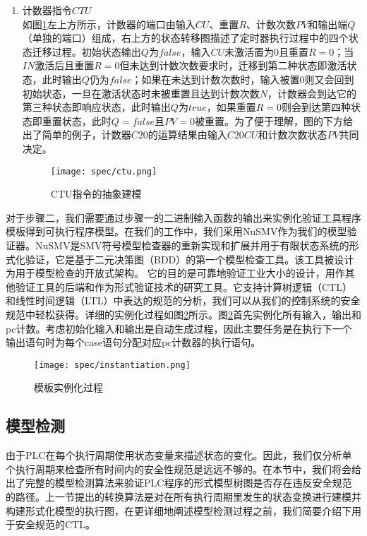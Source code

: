 \begin{enumerate}
	\item 计数器指令$CTU$\\
	如图\ref{fig23}左上方所示，计数器的端口由输入$CU$、重置$R$、计数次数$PV$和输出端$Q$（单独的端口）组成，右上方的状态转移图描述了定时器执行过程中的四个状态迁移过程。初始状态输出$Q$为$false$，输入$CU$未激活置为0且重置$R=0$；当$IN$激活后且重置$R=0$但未达到计数次数要求时，迁移到第二种状态即激活状态，此时输出$Q$仍为$false$；如果在未达到计数次数时，输入被置0则又会回到初始状态，一旦在激活状态时未被重置且达到计数次数$N$，计数器会到达它的第三种状态即响应状态，此时输出$Q$为$true$，如果重置$R=0$则会到达第四种状态即重置状态，此时$Q=false$且$PV=0$被重置。为了便于理解，图的下方给出了简单的例子，计数器$C20$的运算结果由输入$C20CU$和计数次数状态$PV$共同决定。

	\begin{figure}[!htb]
	\centering
	\texttt{[image: spec/ctu.png]}
	\caption{CTU指令的抽象建模}
	\label{fig23}
	\end{figure}
\end{enumerate}

对于步骤二，我们需要通过步骤一的二进制输入函数的输出来实例化验证工具程序模板得到可执行程序模型。在我们的工作中，我们采用NuSMV作为我们的模型验证器。NuSMV是SMV符号模型检查器的重新实现和扩展并用于有限状态系统的形式化验证，它是基于二元决策图（BDD）的第一个模型检查工具。该工具被设计为用于模型检查的开放式架构。 它的目的是可靠地验证工业大小的设计，用作其他验证工具的后端和作为形式验证技术的研究工具。它支持计算树逻辑（CTL）和线性时间逻辑（LTL）中表达的规范的分析，我们可以从我们的控制系统的安全规范中轻松获得。详细的实例化过程如图\ref{fig24}所示。图\ref{fig24}首先实例化所有输入，输出和pc计数。考虑初始化输入和输出是自动生成过程，因此主要任务是在执行下一个输出语句时为每个case语句分配对应pc计数器的执行语句。

\begin{figure}[!htb]
\centering
\texttt{[image: spec/instantiation.png]}
\caption{模板实例化过程}
\label{fig24}
\end{figure}

\subsection{模型检测}

由于PLC在每个执行周期使用状态变量来描述状态的变化。因此，我们仅分析单个执行周期来检查所有时间内的安全性规范是远远不够的。在本节中，我们将会给出了完整的模型检测算法来验证PLC程序的形式模型树图是否存在违反安全规范的路径。上一节提出的转换算法是对在所有执行周期里发生的状态变换进行建模并构建形式化模型的执行图，在更详细地阐述模型检测过程之前，我们简要介绍下用于安全规范的CTL。

